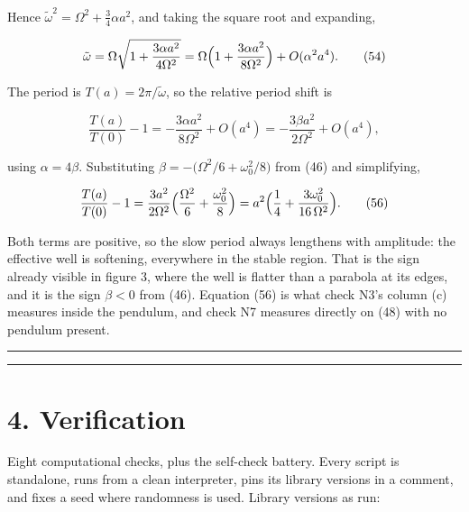 \documentclass[11pt,a4paper]{article}
\newcommand{\tagmark}[1]{\marginnote{\scriptsize\ttfamily #1}}
\newcommand{\Dtag}{\tagmark{[D]}}   %
\begin{document}
Hence \(\tilde\omega^2=\Omega^2+\tfrac34\alpha a^2\), and taking the square root
and expanding,

\begin{equation}
\tilde\omega = \Omega\sqrt{1+\frac{3\alpha a^2}{4\Omega^2}}
   = \Omega\Bigl(1+\frac{3\alpha a^2}{8\Omega^2}\Bigr) + O(\alpha^2a^4).
  \tag{54}
\end{equation}

The period is \(T(a)=2\pi/\tilde\omega\), so the relative period shift is

\begin{equation}
\frac{T(a)}{T(0)}-1 = -\frac{3\alpha a^2}{8\Omega^2} + O(a^4)
   = -\frac{3\beta a^2}{2\Omega^2} + O(a^4), \tag{55}
\end{equation}

using \(\alpha=4\beta\). Substituting
\(\beta=-\bigl(\Omega^2/6+\omega_0^2/8\bigr)\) from (46) and simplifying,

\begin{equation}
\frac{T(a)}{T(0)}-1
 = \frac{3a^2}{2\Omega^2}\Bigl(\frac{\Omega^2}{6}+\frac{\omega_0^2}{8}\Bigr)
 = a^2\Bigl(\frac14 + \frac{3\omega_0^2}{16\,\Omega^2}\Bigr). \tag{56}
\end{equation}

\Dtag{} Both terms are positive, so the slow period always lengthens with
amplitude: the effective well is softening, everywhere in the stable region.
That is the sign already visible in figure 3, where the well is flatter than a
parabola at its edges, and it is the sign \(\beta<0\) from (46). Equation (56) is
what check N3's column (c) measures inside the pendulum, and check N7 measures
directly on (48) with no pendulum present.

\begin{center}\rule{0.5\linewidth}{0.5pt}\end{center}

\begin{center}\rule{0.5\linewidth}{0.5pt}\end{center}

\hypertarget{verification}{%
\section{4. Verification}\label{verification}}

Eight computational checks, plus the self-check battery. Every script is
standalone, runs from a clean interpreter, pins its library versions in a
comment, and fixes a seed where randomness is used. Library versions as run:
\end{document}
